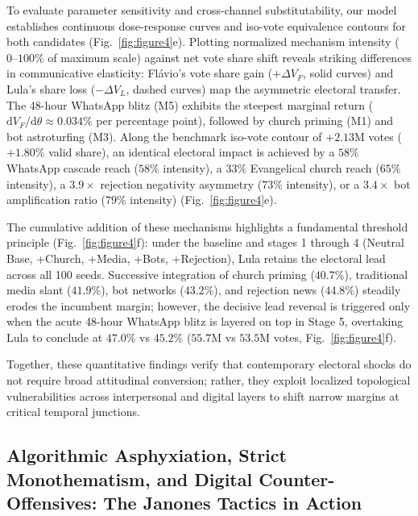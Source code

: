 \documentclass{article}
\begin{document}
To evaluate parameter sensitivity and cross-channel substitutability, our model establishes continuous dose-response curves and iso-vote equivalence contours for both candidates (Fig.~\ref{fig:figure4}e). Plotting normalized mechanism intensity ($0\text{--}100\%$ of maximum scale) against net vote share shift reveals striking differences in communicative elasticity: Fl{\'a}vio's vote share gain ($+\Delta V_F$, solid curves) and Lula's share loss ($-\Delta V_L$, dashed curves) map the asymmetric electoral transfer. The 48-hour WhatsApp blitz (M5) exhibits the steepest marginal return ($\mathrm{d}V_F/\mathrm{d}\theta \approx 0.034\%$ per percentage point), followed by church priming (M1) and bot astroturfing (M3). Along the benchmark iso-vote contour of $+2.13\mathrm{M}$ votes ($+1.80\%$ valid share), an identical electoral impact is achieved by a $58\%$ WhatsApp cascade reach ($58\%$ intensity), a $33\%$ Evangelical church reach ($65\%$ intensity), a $3.9\times$ rejection negativity asymmetry ($73\%$ intensity), or a $3.4\times$ bot amplification ratio ($79\%$ intensity) (Fig.~\ref{fig:figure4}e).

The cumulative addition of these mechanisms highlights a fundamental threshold principle (Fig.~\ref{fig:figure4}f): under the baseline and stages 1 through 4 (Neutral Base, +Church, +Media, +Bots, +Rejection), Lula retains the electoral lead across all 100 seeds. Successive integration of church priming ($40.7\%$), traditional media slant ($41.9\%$), bot networks ($43.2\%$), and rejection news ($44.8\%$) steadily erodes the incumbent margin; however, the decisive lead reversal is triggered only when the acute 48-hour WhatsApp blitz is layered on top in Stage 5, overtaking Lula to conclude at $47.0\%$ vs $45.2\%$ ($55.7\mathrm{M}$ vs $53.5\mathrm{M}$ votes, Fig.~\ref{fig:figure4}f).

Together, these quantitative findings verify that contemporary electoral shocks do not require broad attitudinal conversion; rather, they exploit localized topological vulnerabilities across interpersonal and digital layers to shift narrow margins at critical temporal junctions.




\subsection{Algorithmic Asphyxiation, Strict Monothematism, and Digital Counter-Offensives: The Janones Tactics in Action}
\label{subsec:results_countertactics}
\end{document}
